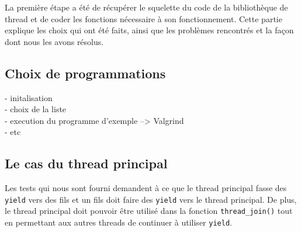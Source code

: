 La première étape a été de récupérer le squelette du code de la bibliothèque de thread et de coder les fonctions nécessaire à son fonctionnement. Cette partie explique les choix qui ont été faits, ainsi que les problèmes rencontrés et la façon dont nous les avons résolus.
\subsection{Choix de programmations}
- initalisation \\
- choix de la liste \\
- execution du programme d'exemple --> Valgrind\\
- etc

\subsection{Le cas du thread principal}

Les tests qui nous sont fourni demandent à ce que le thread principal fasse
des \verb!yield! vers des fils et un fils doit faire des \verb!yield! vers le
thread principal. De plus, le thread principal doit pouvoir être utilisé dans
la fonction \verb!thread_join()! tout en permettant aux autres threads de
continuer à utiliser \verb!yield!.